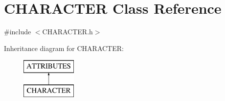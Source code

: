 \hypertarget{class_c_h_a_r_a_c_t_e_r}{}\section{C\+H\+A\+R\+A\+C\+T\+ER Class Reference}
\label{class_c_h_a_r_a_c_t_e_r}


{\ttfamily \#include $<$C\+H\+A\+R\+A\+C\+T\+E\+R.\+h$>$}

Inheritance diagram for C\+H\+A\+R\+A\+C\+T\+ER\+:\begin{figure}[H]
\begin{center}
\leavevmode
\includegraphics[height=2.000000cm]{class_c_h_a_r_a_c_t_e_r}
\end{center}
\end{figure}
